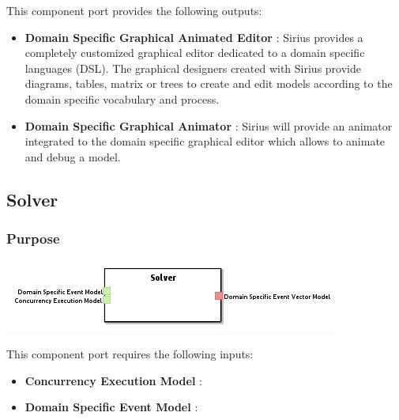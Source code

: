 \documentclass{gemoc} %
\begin{document}
This component port provides the following outputs:
\begin{itemize}
  \item \textbf{Domain Specific Graphical Animated Editor} :
Sirius provides a completely customized graphical editor dedicated to a domain specific languages (DSL). The graphical designers created with Sirius provide diagrams, tables, matrix or trees to create and edit models according to the domain specific vocabulary and process.
  \item \textbf{Domain Specific Graphical Animator} :
Sirius will provide an animator integrated to the domain specific graphical editor which allows to animate and debug a model. 
\end{itemize}


\subsection{Solver}


\subsubsection{Purpose}


\begin{center}
\includegraphics*[trim=0.0cm 0.0cm 0cm 0.0cm, clip=true]{../images/generated/Generated_Solver.png}
\end{center}

This component port requires the following inputs:
\begin{itemize}
  \item \textbf{Concurrency Execution Model} :
  \item \textbf{Domain Specific Event Model} :
\end{itemize}
\end{document}
